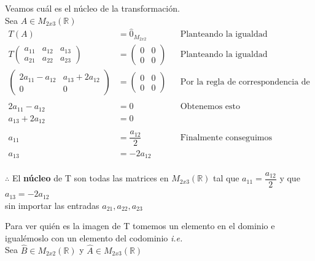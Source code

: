 \documentclass[letterpaper]{article}
\newcommand{\R}{\mathds{R}}
\renewcommand{\*}{\cdot}
\theoremstyle{definition}
\begin{document}
	Veamos cuál es el núcleo de la transformación.\\
	Sea $ A \in M_{2x3}(\mathbb{R}) $
	\begin{align*}
		T(A) & = \hat{0}_{ M_{2x2}} && \text{Planteando la igualdad}\\
		T\begin{pmatrix}
		a_{11} & a_{12} & a_{13}\\
		a_{21} & a_{22} & a_{23}
		\end{pmatrix} & = \begin{pmatrix}
		0 & 0\\
		0 & 0
		\end{pmatrix} && \text{Planteando la igualdad}\\
		\begin{pmatrix} 
		2a_{11} - a_{12} & a_{13} + 2a_{12} \\ 
		0 & 0 \end{pmatrix} &= \begin{pmatrix}
		0 & 0\\
		0 & 0
		\end{pmatrix} && \text{Por la regla de correspondencia de T}\\
		\\
		2a_{11} - a_{12} & = 0 && \text{Obtenemos esto }\\
		a_{13} + 2a_{12} & = 0 && \text{ }\\
		\\
		a_{11} & = \dfrac{ a_{12}}{2} && \text{Finalmente conseguimos }\\
		a_{13} & = -2a_{12} && \text{ }\\
	\end{align*}
	\begin{center}
		$ \therefore $ El \textbf{núcleo} de T son todas las matrices en $ M_{2x3}(\R) $ tal que $ a_{11} = \dfrac{ a_{12}}{2} $ y que $ a_{13}  = -2a_{12} $\\ sin importar las entradas $ a_{21},a_{22},a_{23}  $
	\end{center}
	Para ver quién es la imagen de T tomemos un elemento en el dominio e igualémoslo con un elemento del codominio \textit{i.e.}\\
	Sea $ \hat{B} \in M_{2x2}(\R) $ y $ \hat{A} \in M_{2x3}(\R) $
\end{document}

